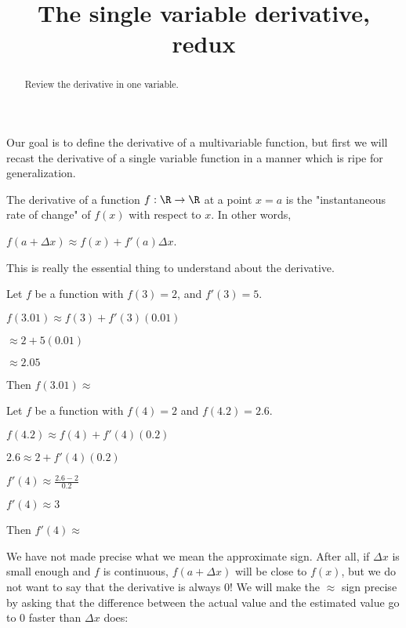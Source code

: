 \documentclass{ximera}
\title{The single variable derivative, redux}
\begin{document}
\begin{abstract}
Review the derivative in one variable.
\end{abstract}

	Our goal is to define the derivative of a multivariable function, but first we will recast the derivative of a single variable function in a
	manner which is ripe for generalization.
	
	The derivative of a function $f:\R \to \R$ at a point $x = a$ is the "instantaneous rate of change" of $f(x)$ with respect to $x$.
	In other words, 
	
	$f(a + \Delta x) \approx f(x) +f'(a)\Delta x$.
	
	This is really the essential thing to understand about the derivative.
	
	\begin{question}
		Let $f$ be a function with $f(3)  = 2$, and $f'(3) = 5$.
		\begin{solution}
			\begin{hint}
				$f(3.01) \approx f(3)+f'(3)(0.01)$
			\end{hint}
			\begin{hint}
				$\approx 2+5(0.01)$
			\end{hint}
			\begin{hint}
				$\approx 2.05$
			\end{hint}
			Then $f(3.01) \approx $ 
		\end{solution}
	\end{question}
	
	\begin{question}
		Let $f$ be a function with $f(4)=2$ and $f(4.2) = 2.6$.  
		
		\begin{solution}
			\begin{hint}
				$f(4.2) \approx f(4)+f'(4)(0.2)$
			\end{hint}
			\begin{hint}
				$2.6 \approx 2+f'(4)(0.2)$
			\end{hint}
			\begin{hint}
				$f'(4) \approx \frac{2.6 - 2}{0.2}$
			\end{hint}
			\begin{hint}
				$f'(4) \approx 3$
			\end{hint}
			Then $f'(4) \approx$ \answer{3}
		\end{solution}
	\end{question}
	
	We have not made precise what we mean the approximate sign.  After all, if $\Delta x$ is small enough and $f$ is continuous, 
	$f(a+\Delta x)$ will be close to $f(x)$, but we do not want to say that the derivative is always $0$!  We will make the  $\approx$ sign precise by asking that the difference 
	between the actual value and the estimated value go to $0$ faster than $\Delta x$ does:
	
\end{document}
